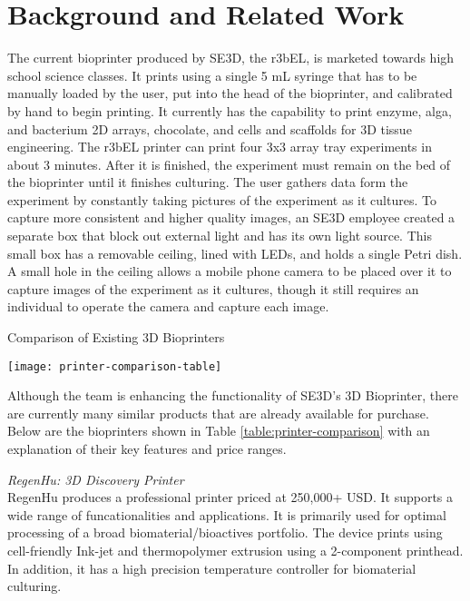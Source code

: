 
\section{Background and Related Work}

The current bioprinter produced by SE3D, the r3bEL, is marketed towards high school science classes. It prints using a single 5 mL syringe that has to be manually loaded by the user, put into the head of the bioprinter, and calibrated by hand to begin printing. It currently has the capability to print enzyme, alga, and bacterium 2D arrays, chocolate, and cells and scaffolds for 3D tissue engineering. The r3bEL printer can print four 3x3 array tray experiments in about 3 minutes. After it is finished, the experiment must remain on the bed of the bioprinter until it finishes culturing. The user gathers data form the experiment by constantly taking pictures of the experiment as it cultures. To capture more consistent and higher quality images, an SE3D employee created a separate box that block out external light and has its own light source. This small box has a removable ceiling, lined with LEDs, and holds a single Petri dish. A small hole in the ceiling allows a mobile phone camera to be placed over it to capture images of the experiment as it cultures, though it still requires an individual to operate the camera and capture each image.


\begin{table}[H]
\caption{\label{table:printer-comparison} Comparison of Existing 3D Bioprinters}
\texttt{[image: printer-comparison-table]}
\end{table}
Although the team is enhancing the functionality of SE3D’s 3D Bioprinter, there are currently many similar products that are already available for purchase. Below are the bioprinters shown in Table \ref{table:printer-comparison} with an explanation of their key features and price ranges.



\textit{RegenHu: 3D Discovery Printer} \\
RegenHu produces a professional printer priced at 250,000+ USD. It supports a wide range of funcationalities and applications. It is primarily used for optimal processing of a broad biomaterial/bioactives portfolio. The device prints using cell-friendly Ink-jet and thermopolymer extrusion using a 2-component printhead. In addition, it has a high precision temperature controller for biomaterial culturing.

